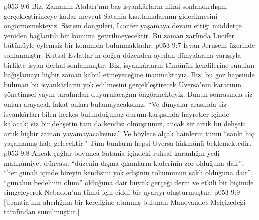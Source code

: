 \vs p053 9:6 Biz, Zamanın Ataları’nın baş isyankârların nihai sonlandırılışını gerçekleştirinceye kadar mevcut Satania kısıtlamalarının giderilmesini öngörmemekteyiz. Sistem döngüleri, Lucifer yaşamaya devam ettiği müddetçe yeniden bağlantılı bir konuma getirilmeyecektir. Bu zaman zarfında Lucifer bütünüyle eylemsiz bir konumda bulunmaktadır.
\vs p053 9:7 İsyan Jerusem üzerinde sonlanmıştır. Kutsal Evlatlar’ın doğru düzenden ayrılan dünyalarına varışıyla birlikte isyan derhal sonlanmıştır. Biz, isyankârların tümünün kendilerine sunulan bağışlamayı hiçbir zaman kabul etmeyeceğine inanmaktayız. Biz, bu göz hapsinde bulunan bu isyankârların yok edilmesini gerçekleştirecek Uversa’nın kararının yönetimsel yayın tarafından duyurulacağını öngörmekteyiz. Bunun sonrasında siz onları arayacak fakat onları bulamayacaksınız. “Ve dünyalar arasında siz isyankârları bilen herkes bulunduğunuz durum karşısında hayretler içinde kalacak; siz bir dehşetin tam da kendisi olmuştunuz, ancak siz artık bu dehşeti artık hiçbir zaman yayamayacaksınız.” Ve böylece alçak hainlerin tümü “sanki hiç yaşamamış hale gelecektir.” Tüm bunların hepsi Uversa hükmünü beklemektedir.
\vs p053 9:8 Ancak çağlar boyunca Satania içindeki ruhsal karanlığın yedi mahkûmiyet dünyası; “düzenin dışına çıkanların kaderinin zor olduğuna dair”, “her günah içinde bireyin kendisini yok edişinin tohumunun saklı olduğuna dair”, “günahın bedelinin ölüm” olduğuna dair büyük gerçeği derin ve etkili bir biçimde simgeleyerek Nebadon’un tümü için ciddi bir uyarıyı oluşturmuştur.
\vs p053 9:9 [Urantia’nın alıcılığına bir kereliğine atanmış bulunan Manovandet Melçizedeği tarafından sunulmuştur.]

